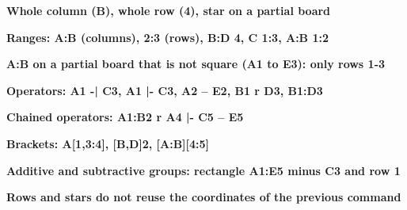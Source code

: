 \documentclass{article}
\newcommand\case[1]{\par\medskip\noindent\textbf{#1}\par\nopagebreak}
\begin{document}
\case{Whole column (B), whole row (4), star on a partial board}
\begin{goban}[5]\end{goban}
\begin{goban}[5]\end{goban}
\begin{goban}[7, partial = B2:D4]\stones[b]{*}\end{goban}

\case{Ranges: A:B (columns), 2:3 (rows), B:D 4, C 1:3, A:B 1:2}
\begin{goban}[5]\end{goban}
\begin{goban}[5]\end{goban}
\begin{goban}[5]\end{goban}
\begin{goban}[5]\end{goban}
\begin{goban}[5]\end{goban}

\case{A:B on a partial board that is not square (A1 to E3): only rows 1-3}
\begin{goban}[9, partial = A1:E3]\end{goban}

\case{Operators: A1 -| C3, A1 |- C3, A2 -- E2, B1 r D3, B1:D3}
\begin{goban}[5]\end{goban}
\begin{goban}[5]\end{goban}
\begin{goban}[5]\end{goban}
\begin{goban}[5]\end{goban}
\begin{goban}[5]\end{goban}

\case{Chained operators: A1:B2 r A4 |- C5 -- E5}
\begin{goban}[5]\end{goban}

\case{Brackets: A[1,3:4], [B,D]2, [A:B][4:5]}
\begin{goban}[5]\end{goban}
\begin{goban}[5]\end{goban}
\begin{goban}[5]\stones[b]{[A:B][4:5]}\end{goban}

\case{Additive and subtractive groups: rectangle A1:E5 minus C3 and row 1}
\begin{goban}[5]\end{goban}

\case{Rows and stars do not reuse the coordinates of the previous command}
\begin{goban}[5]\end{goban}
\end{document}
